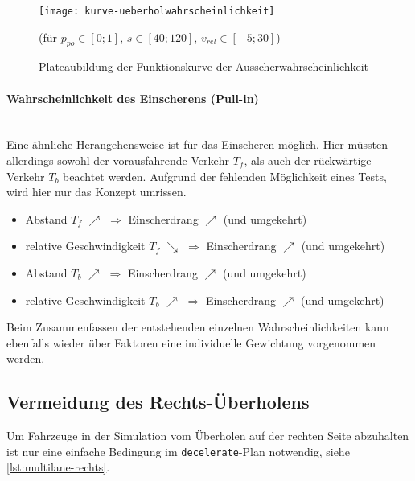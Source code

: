\begin{figure}[hptb]
 \centering
 \texttt{[image: kurve-ueberholwahrscheinlichkeit]}
 \caption[Funktionskurve für die Ausscherwahrscheinlichkeit]
 		 {Plateaubildung der Funktionskurve der Ausscherwahrscheinlichkeit}
 		 {\footnotesize(für $ p_{po} \in [0; 1] $, $ s \in [ 40; 120 ] $, $ v_{rel} \in [ -5; 30 ] $)}
 \label{figure:kurve-ueberholwahrscheinlichkeit}
\end{figure} 


\paragraph*{Wahrscheinlichkeit des Einscherens (Pull-in)} 
\hfill \\
Eine ähnliche Herangehensweise ist für das Einscheren möglich.
Hier müssten allerdings sowohl der vorausfahrende Verkehr $ T_{f} $, als auch der rückwärtige Verkehr $ T_{b} $ beachtet werden. 
Aufgrund der fehlenden Möglichkeit eines Tests, wird hier nur das Konzept umrissen.

\begin{itemize}
    \itemsep0em
    \item Abstand $ T_{f} $ $ \nearrow $ $ \Longrightarrow $ Einscherdrang $ \nearrow $ (und umgekehrt)
    \item relative Geschwindigkeit $ T_{f} $ $ \searrow $ $ \Longrightarrow $ Einscherdrang $ \nearrow $ (und umgekehrt)
    \item Abstand $ T_{b} $ $ \nearrow $ $ \Longrightarrow $ Einscherdrang $ \nearrow $ (und umgekehrt)
    \item relative Geschwindigkeit $ T_{b} $ $ \nearrow $ $ \Longrightarrow $ Einscherdrang $ \nearrow $ (und umgekehrt)
\end{itemize}

Beim Zusammenfassen der entstehenden einzelnen Wahrscheinlichkeiten kann ebenfalls wieder über Faktoren eine individuelle Gewichtung vorgenommen werden.






\subsection{Vermeidung des Rechts-Überholens}

Um Fahrzeuge in der Simulation vom Überholen auf der rechten Seite abzuhalten ist nur eine einfache Bedingung im \texttt{decelerate}-Plan notwendig, siehe \cref{lst:multilane-rechts}.

